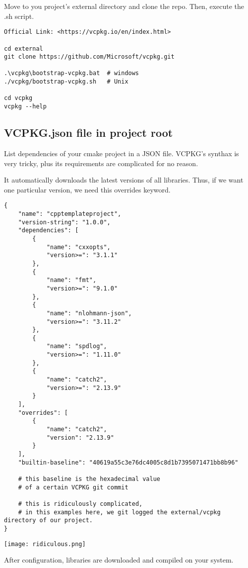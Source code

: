\documentclass[openany]{report}
\begin{document}
Move to you project's external directory and clone the repo. Then, execute the .sh script.
 
\begin{verbatim}
Official Link: <https://vcpkg.io/en/index.html>

cd external
git clone https://github.com/Microsoft/vcpkg.git

.\vcpkg\bootstrap-vcpkg.bat  # windows
./vcpkg/bootstrap-vcpkg.sh   # Unix

cd vcpkg 
vcpkg --help 
\end{verbatim}


\subsection{VCPKG.json file in project root}

List dependencies of your cmake project in a JSON file. VCPKG's synthax is very tricky, plus its 
requirements are complicated for no reason.

It automatically downloads the latest versions of all libraries. Thus, if we want one particular
version, we need this overrides keyword.

\begin{verbatim}
{
    "name": "cpptemplateproject",
    "version-string": "1.0.0",
    "dependencies": [
        {
            "name": "cxxopts",
            "version>=": "3.1.1"
        },
        {
            "name": "fmt",
            "version>=": "9.1.0"
        },
        {
            "name": "nlohmann-json",
            "version>=": "3.11.2"
        },
        {
            "name": "spdlog",
            "version>=": "1.11.0"
        },
        {
            "name": "catch2",
            "version>=": "2.13.9"
        }
    ],
    "overrides": [
        {
            "name": "catch2",
            "version": "2.13.9"
        }
    ],
    "builtin-baseline": "40619a55c3e76dc4005c8d1b7395071471bb8b96"

    # this baseline is the hexadecimal value
    # of a certain VCPKG git commit

    # this is ridiculously complicated,
    # in this examples here, we git logged the external/vcpkg directory of our project.
}
\end{verbatim}


\begin{center}
    \texttt{[image: ridiculous.png]}
\end{center}


After configuration, libraries are downloaded and compiled on your system.
\end{document}
